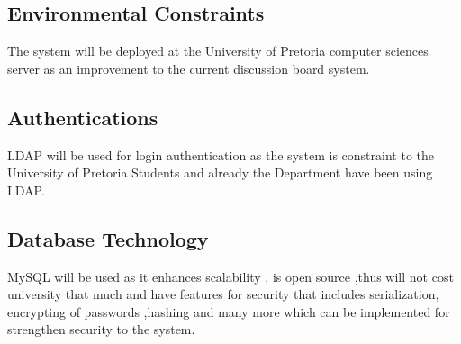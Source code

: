 \begin{enumerate}
\subsection*{ Environmental Constraints}
The system will be deployed at the University of Pretoria computer sciences server as an improvement to the current discussion board system.

\subsection*{Authentications}
LDAP will be used for login authentication as the system is constraint to the University of Pretoria Students and already the Department have been using LDAP.

\subsection*{ Database Technology}
MySQL will be used as it enhances scalability , is open source ,thus will not cost university that much and have features for security that includes serialization, encrypting of passwords ,hashing and many more which can be implemented for strengthen security to the system.
		

		
					
				
				
	\end{enumerate}

%
